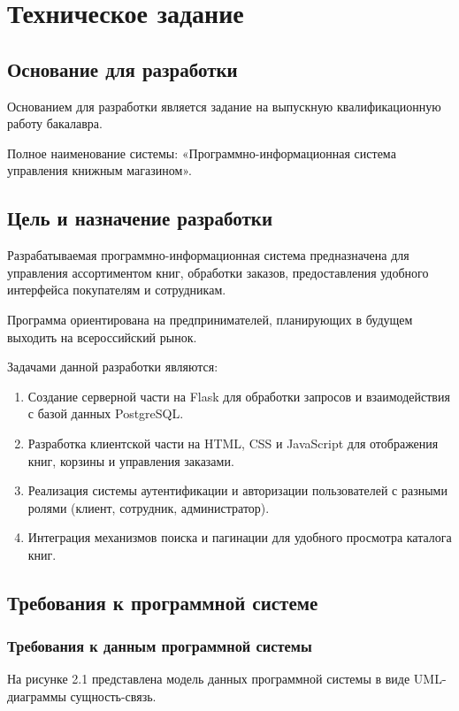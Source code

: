 \section{Техническое задание}
\subsection{Основание для разработки}

Основанием для разработки является задание на выпускную квалификационную работу бакалавра.

 Полное наименование системы: «Программно-информационная система управления книжным магазином».

\subsection{Цель и назначение разработки}

Разрабатываемая программно-информационная система предназначена для управления ассортиментом книг, обработки заказов, предоставления удобного интерфейса покупателям и сотрудникам.

Программа ориентирована на предпринимателей, планирующих в будущем выходить на всероссийский рынок.

Задачами данной разработки являются:
\begin{enumerate}
\item Создание серверной части на Flask для обработки запросов и взаимодействия с базой данных PostgreSQL.
\item Разработка клиентской части на HTML, CSS и JavaScript для отображения книг, корзины и управления заказами.
\item Реализация системы аутентификации и авторизации пользователей с разными ролями (клиент, сотрудник, администратор).
\item Интеграция механизмов поиска и пагинации для удобного просмотра каталога книг.
\end{enumerate}


\subsection{Требования к программной системе}


\subsubsection{Требования к данным программной системы}


На рисунке 2.1 представлена модель данных программной системы в виде UML-диаграммы сущность-связь.


